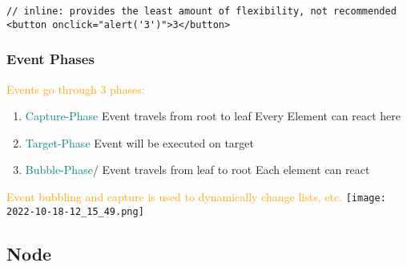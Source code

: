 \documentclass[main.tex,fontsize=6pt,paper=a4,paper=landscape,DIV=calc,]{scrartcl}
\begin{document}
\begin{multicols*}{4}
\begin{lstlisting}
// inline: provides the least amount of flexibility, not recommended
<button onclick="alert('3')">3</button>
\end{lstlisting}
\vspace{2mm}

\subsubsection{Event Phases} 
\textcolor{orange}{Events go through 3 phases:}\newline
\begin{enumerate}
  \item \textcolor{teal}{Capture-Phase}\newline
    Event travels from root to leaf\newline
    Every Element can react here
  \item \textcolor{teal}{Target-Phase}\newline
    Event will be executed on target
  \item \textcolor{teal}{Bubble-Phase}\newline/
    Event travels from leaf to root\newline
    Each element can react
\end{enumerate}
\vspace{2mm}
\textcolor{orange}{Event bubbling and capture is used to dynamically change lists, etc.}\newline
\texttt{[image: 2022-10-18-12\_15\_49.png]}

\subsection{Node}


\end{multicols*}
\end{document}

